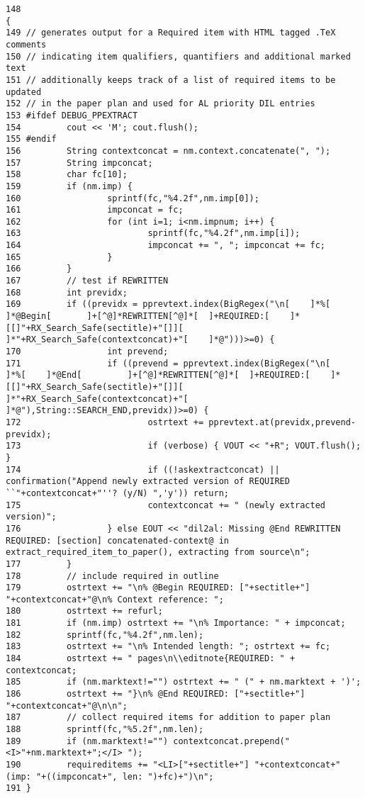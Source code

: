 \footnotesize\begin{verbatim}148                                                                                                                                                           {
149 // generates output for a Required item with HTML tagged .TeX comments
150 // indicating item qualifiers, quantifiers and additional marked text
151 // additionally keeps track of a list of required items to be updated
152 // in the paper plan and used for AL priority DIL entries
153 #ifdef DEBUG_PPEXTRACT
154         cout << 'M'; cout.flush();
155 #endif
156         String contextconcat = nm.context.concatenate(", ");
157         String impconcat;
158         char fc[10];
159         if (nm.imp) {
160                 sprintf(fc,"%4.2f",nm.imp[0]);
161                 impconcat = fc;
162                 for (int i=1; i<nm.impnum; i++) {
163                         sprintf(fc,"%4.2f",nm.imp[i]);
164                         impconcat += ", "; impconcat += fc;
165                 }
166         }
167         // test if REWRITTEN
168         int previdx;
169         if ((previdx = pprevtext.index(BigRegex("\n[    ]*%[    ]*@Begin[       ]+[^@]*REWRITTEN[^@]*[  ]+REQUIRED:[    ]*[[]"+RX_Search_Safe(sectitle)+"[]][   ]*"+RX_Search_Safe(contextconcat)+"[    ]*@")))>=0) {
170                 int prevend;
171                 if ((prevend = pprevtext.index(BigRegex("\n[    ]*%[    ]*@End[         ]+[^@]*REWRITTEN[^@]*[  ]+REQUIRED:[    ]*[[]"+RX_Search_Safe(sectitle)+"[]][   ]*"+RX_Search_Safe(contextconcat)+"[    ]*@"),String::SEARCH_END,previdx))>=0) {
172                         ostrtext += pprevtext.at(previdx,prevend-previdx);
173                         if (verbose) { VOUT << "+R"; VOUT.flush(); }
174                         if ((!askextractconcat) || confirmation("Append newly extracted version of REQUIRED ``"+contextconcat+"''? (y/N) ",'y')) return;
175                         contextconcat += " (newly extracted version)";
176                 } else EOUT << "dil2al: Missing @End REWRITTEN REQUIRED: [section] concatenated-context@ in extract_required_item_to_paper(), extracting from source\n";
177         }
178         // include required in outline
179         ostrtext += "\n% @Begin REQUIRED: ["+sectitle+"] "+contextconcat+"@\n% Context reference: ";
180         ostrtext += refurl;
181         if (nm.imp) ostrtext += "\n% Importance: " + impconcat;
182         sprintf(fc,"%4.2f",nm.len);
183         ostrtext += "\n% Intended length: "; ostrtext += fc;
184         ostrtext += " pages\n\\editnote{REQUIRED: " + contextconcat;
185         if (nm.marktext!="") ostrtext += " (" + nm.marktext + ')';
186         ostrtext += "}\n% @End REQUIRED: ["+sectitle+"] "+contextconcat+"@\n\n";
187         // collect required items for addition to paper plan
188         sprintf(fc,"%5.2f",nm.len);
189         if (nm.marktext!="") contextconcat.prepend("<I>"+nm.marktext+";</I> ");
190         requireditems += "<LI>["+sectitle+"] "+contextconcat+" (imp: "+((impconcat+", len: ")+fc)+")\n";
191 }
\end{verbatim}\normalsize 
{}
